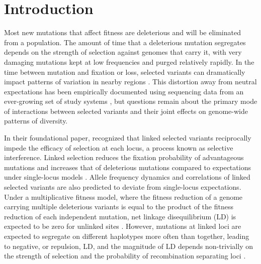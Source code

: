 \documentclass[]{article}
\begin{document}
\section{Introduction}\label{sec:introduction}

Most new mutations that affect fitness are deleterious and will be eliminated
from a population. The amount of time that a deleterious mutation segregates
depends on the strength of selection against genomes that carry it, with very
damaging mutations kept at low frequencies and purged relatively rapidly. In
the time between mutation and fixation or loss, selected variants can
dramatically impact patterns of variation in nearby regions
\citep{Smith1974-em,Charlesworth1995-dq,Kim2000-on}. This distortion
away from neutral expectations has been empirically documented using sequencing
data from an ever-growing set of study systems
\citep[e.g.,][]{Novembre2009-kc,Cutter2013-mm,Comeron2014-oy}, but questions remain
about the primary mode of interactions between selected variants and their
joint effects on genome-wide patterns of diversity.

In their foundational paper, \citet{Hill1966-gv} recognized that linked
selected variants reciprocally impede the efficacy of selection at each locus,
a process known as selective interference. Linked selection reduces the
fixation probability of advantageous mutations and increases that of
deleterious mutations compared to expectations under single-locus models
\citep{Birky1988-jm}. Allele frequency dynamics and correlations of linked
selected variants are also predicted to deviate from single-locus expectations.
Under a multiplicative fitness model, where the fitness reduction of a genome
carrying multiple deleterious variants is equal to the product of the fitness
reduction of each independent mutation, net linkage disequilibrium (LD) is
expected to be zero for unlinked sites \citep{Kondrashov1995-va}.  However,
mutations at linked loci are expected to segregate on different haplotypes more
often than together, leading to negative, or repulsion, LD, and the magnitude
of LD depends non-trivially on the strength of selection and the probability of
recombination separating loci \citep{Hill1966-gv,McVean2000-ox}.
\end{document}
